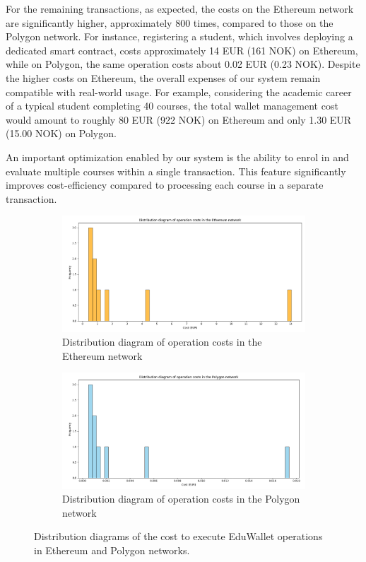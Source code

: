 

For the remaining transactions, as expected, the costs on the Ethereum network are significantly higher, approximately 800 times, compared to those on the Polygon network. For instance, registering a student, which involves deploying a dedicated smart contract, costs approximately 14 EUR (161 NOK) on Ethereum, while on Polygon, the same operation costs about 0.02 EUR (0.23 NOK). Despite the higher costs on Ethereum, the overall expenses of our system remain compatible with real-world usage. For example, considering the academic career of a typical student completing 40 courses, the total wallet management cost would amount to roughly 80 EUR (922 NOK) on Ethereum and only 1.30 EUR (15.00 NOK) on Polygon.   

An important optimization enabled by our system is the ability to enrol in and evaluate multiple courses within a single transaction. This feature significantly improves cost-efficiency compared to processing each course in a separate transaction.

\begin{figure}
    \centering
    \begin{subfigure}{0.99\textwidth}
      \centering
      \includegraphics[width=\textwidth]{figures/ethCosts.png}
      \caption{Distribution diagram of operation costs in the Ethereum network}
      \label{fig:ethCosts}
    \end{subfigure}
    \hfill
    \begin{subfigure}{0.99\textwidth}
      \centering
      \includegraphics[width=\textwidth]{figures/polCosts.png}
      \caption{Distribution diagram of operation costs in the Polygon network}
      \label{fig:polCosts}
    \end{subfigure}
    \caption[Distribution diagram of operation costs in Ethereum and Polygon]{Distribution diagrams of the cost to execute EduWallet operations in Ethereum and Polygon networks.}
    \label{fig:operationCosts}
\end{figure}

